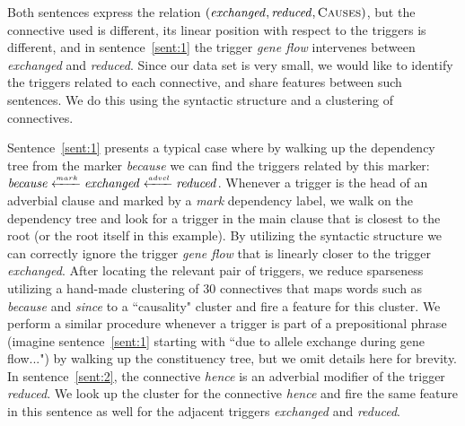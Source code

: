 Both sentences express the relation $(\mbox{\emph{exchanged}},\mbox{\emph{reduced}},\mbox{\textsc{Causes}})$, but the connective used is different, its linear position with respect to the triggers is different, and in sentence~\ref{sent:1} the trigger \emph{gene flow} intervenes between \emph{exchanged} and \emph{reduced}. Since our data set is very small, we would like to identify the triggers related to each connective, and share features between such sentences. We do this using the syntactic structure and a clustering of connectives.

Sentence~\ref{sent:1} presents a typical case where by walking up the dependency tree from the marker \emph{because} we can find the triggers related by this marker: $\mbox{\emph{because}}\xleftarrow{\scriptscriptstyle mark}\mbox{\emph{exchanged}}\xleftarrow{\scriptscriptstyle advcl}\mbox{\emph{reduced}}$. Whenever a trigger is the head of an adverbial clause and marked by a \emph{mark} dependency label, we walk on the dependency tree and look for a trigger in the main clause that is closest to the root (or the root itself in this example). 
By utilizing the syntactic structure we can correctly ignore the trigger \emph{gene flow} that is linearly closer to the trigger \emph{exchanged}. After locating the relevant pair of triggers, we reduce sparseness utilizing a hand-made clustering of 30 connectives that maps words such as \emph{because} and \emph{since} to a ``causality" cluster and fire a feature for this cluster. We perform a similar procedure whenever a trigger is part of a prepositional phrase (imagine sentence~\ref{sent:1} starting with ``due to allele exchange during gene flow...") by walking up the constituency tree, but we omit details here for brevity. In sentence~\ref{sent:2}, the connective \emph{hence} is an adverbial modifier of the trigger \emph{reduced}. We look up the cluster for the connective \emph{hence} and fire the same feature in this sentence as well for the adjacent triggers \emph{exchanged} and \emph{reduced}.

